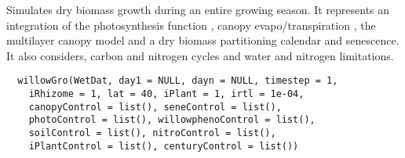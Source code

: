 \documentclass[letterpaper]{book}
\begin{document}
%
\begin{Description}\relax
Simulates dry biomass growth during an entire growing
season.  It represents an integration of the
photosynthesis function , canopy
evapo/transpiration , the multilayer
canopy model  and a dry biomass
partitioning calendar and senescence. It also considers,
carbon and nitrogen cycles and water and nitrogen
limitations.
\end{Description}
%
\begin{Usage}
\begin{verbatim}
  willowGro(WetDat, day1 = NULL, dayn = NULL, timestep = 1,
    iRhizome = 1, lat = 40, iPlant = 1, irtl = 1e-04,
    canopyControl = list(), seneControl = list(),
    photoControl = list(), willowphenoControl = list(),
    soilControl = list(), nitroControl = list(),
    iPlantControl = list(), centuryControl = list())
\end{verbatim}
\end{Usage}
%
\end{document}
